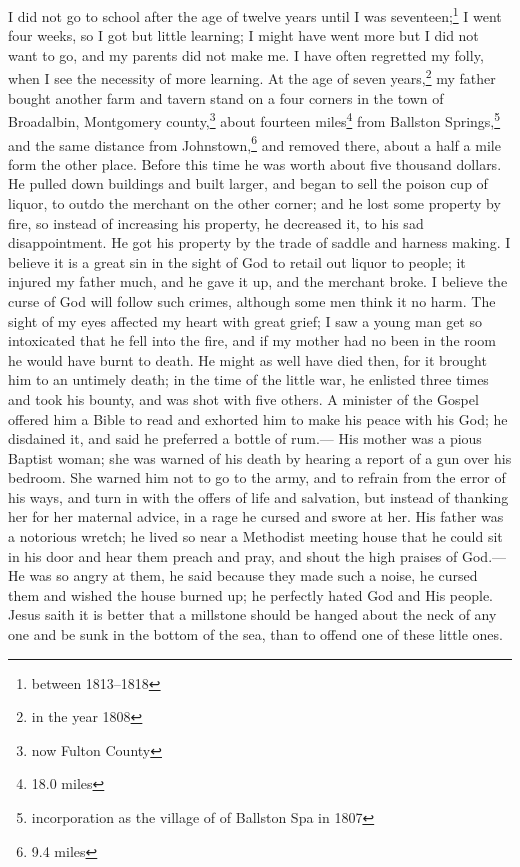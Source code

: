 I did not go to school after the age of twelve years until I was seventeen;\footnote{between 1813--1818} I went four weeks, so I got but little learning; I might have went more but I did not want to go, and my parents did not make me.
I have often regretted my folly, when I see the necessity of more learning.
At the age of seven years,\footnote{in the year 1808} my father bought another farm and tavern stand on a four corners in the town of Broadalbin, Montgomery county,\footnote{now Fulton County} about fourteen miles\footnote{18.0 miles} from Ballston Springs,\footnote{incorporation as the village of of Ballston Spa in 1807} and the same distance from Johnstown,\footnote{9.4 miles} and removed there, about a half a mile form the other place.
Before this time he was worth about five thousand dollars.
He pulled down buildings and built larger, and began to sell the poison cup of liquor, to outdo the merchant on the other corner; and he lost some property by fire, so instead of increasing his property, he decreased it, to his sad disappointment.
He got his property by the trade of saddle and harness making.
I believe it is a great sin in the sight of God to retail out liquor to people; it injured my father much, and he gave it up, and the merchant broke.
I believe the curse of God will follow such crimes, although some men think it no harm.
The sight of my eyes affected my heart with great grief; I saw a young man get so intoxicated that he fell into the fire, and if my mother had no been in the room he would have burnt to death.
He might as well have died then, for it brought him to an untimely death; in the time of the little war, he enlisted three times and took his bounty, and was shot with five others.
A minister of the Gospel offered him a Bible to read and exhorted him to make his peace with his God; he disdained it, and said he preferred a bottle of rum.---%
His mother was a pious Baptist woman; she was warned of his death by hearing a report of a gun over his bedroom.
She warned him not to go to the army, and to refrain from the error of his ways, and turn in with the offers of life and salvation, but instead of thanking her for her maternal advice, in a rage he cursed and swore at her.
His father was a notorious wretch; he lived so near a Methodist meeting house that he could sit in his door and hear them preach and pray, and shout the high praises of God.---%
He was so angry at them, he said because they made such a noise, he cursed them and wished the house burned up; he perfectly hated God and His people.
Jesus saith it is better that a millstone should be hanged about the neck of any one and be sunk in the bottom of the sea, than to offend one of these little ones.
